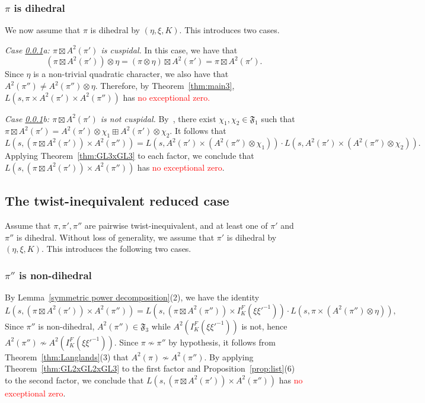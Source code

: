 \documentclass[11pt]{amsart}
\theoremstyle{remark}
\numberwithin{equation}{section}
\begin{document}
\subsubsection{$\pi$ is dihedral}
\label{subsubsec:GL2xGL3xGL3_pi_dihedral}

We now assume that $\pi$ is dihedral by $(\eta,\xi,K)$.  This introduces two cases.

{\it Case \ref{subsubsec:GL2xGL3xGL3_pi_dihedral}a:  $\pi \boxtimes A^2(\pi')$ is cuspidal.}  In this case, we have that
\[
(\pi \boxtimes A^2(\pi')) \otimes \eta = (\pi \otimes \eta) \boxtimes A^2(\pi') = \pi \boxtimes A^2(\pi').
\]
Since $\eta$ is a non-trivial quadratic character, we also have that $A^2(\pi'') \neq A^2(\pi'') \otimes \eta$.  Therefore, by Theorem~\ref{thm:main3}, $L(s,\pi \times A^2(\pi') \times A^2(\pi''))$ has \textcolor{red}{no exceptional zero.}

{\it Case \ref{subsubsec:GL2xGL3xGL3_pi_dihedral}b:  $\pi \boxtimes A^2(\pi')$ is not cuspidal.}  By~\cite[Theorem 9.1]{RamakrishnanWang2}, there exist $\chi_1,\chi_2\in\mathfrak{F}_1$ such that $\pi\boxtimes A^2(\pi')=A^2(\pi')\otimes\chi_1\boxplus A^2(\pi')\otimes\chi_2$.  It follows that
\[
L(s,(\pi \boxtimes A^2(\pi')) \times A^2(\pi'')) = L(s,A^2(\pi') \times (A^2(\pi'') \otimes \chi_1)) \cdot L(s,A^2(\pi') \times (A^2(\pi'') \otimes \chi_2)).
\]
Applying Theorem~\ref{thm:GL3xGL3} to each factor, we conclude that $L(s,(\pi \boxtimes A^2(\pi')) \times A^2(\pi''))$ has \textcolor{red}{no exceptional zero}.

\subsection{The twist-inequivalent reduced case}
Assume that $\pi,\pi',\pi''$ are pairwise twist-inequivalent, and at least one of $\pi'$ and $\pi''$ is dihedral.  Without loss of generality, we assume that $\pi'$ is dihedral by $(\eta,\xi,K)$.  This introduces the following two cases.
\subsubsection{$\pi''$ is non-dihedral}
By Lemma~\ref{symmetric power decomposition}(2), we have the identity
\[
L(s,(\pi \boxtimes A^2(\pi')) \times A^2(\pi'')) = L(s,(\pi  \boxtimes A^2(\pi''))\times I_K^F(\xi{\xi'}^{-1})) \cdot L(s,\pi \times (A^2(\pi'') \otimes \eta)),
\]
Since $\pi''$ is non-dihedral, $A^2(\pi'')\in\mathfrak{F}_3$ while $A^2(I_K^F(\xi{\xi'}^{-1}))$ is not, hence $A^2(\pi'')\not\sim A^2(I_K^F(\xi{\xi'}^{-1}))$.  Since $\pi\not\sim\pi''$ by hypothesis, it follows from Theorem~\ref{thm:Langlands}(3) that $A^2(\pi)\not\sim A^2(\pi'')$.  By applying  Theorem~\ref{thm:GL2xGL2xGL3} to the first factor and Proposition~\ref{prop:list}(6) to the second factor, we conclude that $L(s,(\pi \boxtimes A^2(\pi')) \times A^2(\pi''))$ has \textcolor{red}{no exceptional zero}.
\end{document}
